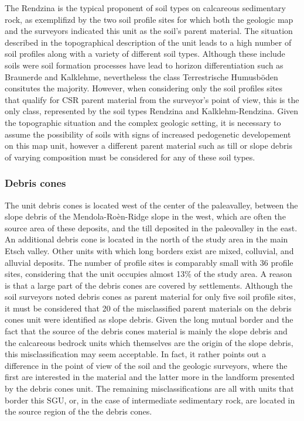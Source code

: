 \documentclass[preprint,12pt,authoryear]{elsarticle}
\begin{document}
The Rendzina is the typical proponent of soil types on calcareous sedimentary rock, as exemplifizd by the two soil profile sites for which both the geologic map and the surveyors indicated this unit as the soil's parent material. The situation described in the topographical description of the unit leads to a high number of soil profiles along with a variety of different soil types. Although these include soils were soil formation processes have lead to horizon differentiation such as Braunerde and Kalklehme, nevertheless the class Terrestrische Humusb\"oden consitutes the majority. However, when considering only the soil profiles sites that qualify for CSR parent material from the surveyor's point of view, this is the only class, represented by the soil types Rendzina  and Kalklehm-Rendzina. Given the topographic situation and the complex geologic setting, it is necessary to assume the possibility of soils with signs of increased pedogenetic developement on this map unit, however a different parent material such as till or slope debris of varying composition must be considered for any of these soil types. 

\subsubsection{Debris cones}
The unit debris cones is located west of the center of the paleavalley, between the slope debris of the Mendola-Ro\`en-Ridge slope in the west, which are often the source area of these deposits, and the till deposited in the paleovalley in the east. An additional debris cone is located in the north of the study area in the main Etsch valley. Other units with which long borders exist are mixed, colluvial, and alluvial deposits. The number of profile sites is comparably small with 36 profile sites, considering that the unit occupies almost 13\% of the study area. A reason is that a large part of the debris cones are covered by settlements.  Although the soil surveyors noted debris cones as parent material for only five soil profile sites, it must be considered that 20 of the misclassified parent materials on the debris cones unit were identified as slope debris. Given the long mutual border and the fact that the source of the debris cones material is mainly the slope debris and the calcareous bedrock units which themselves are the origin of the slope debris, this misclassification may seem acceptable. In fact, it rather points out a difference in the point of view of the soil and the geologic surveyors, where the first are interested in the material and the latter more in the landform presented by the debris cones unit. The remaining misclassifications are all with units that border this SGU, or, in the case of intermediate sedimentary rock, are located in the source region of the the debris cones.
\end{document}
